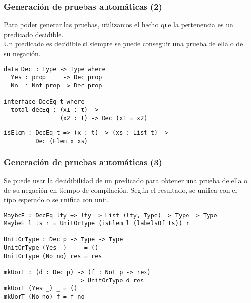 \documentclass{beamer}
\begin{document}
\begin{frame}[fragile]
\frametitle{Generación de pruebas automáticas (2)}

Para poder generar las pruebas, utilizamos el hecho que la pertenencia es un predicado decidible. \\

Un predicado es decidible si siempre se puede conseguir una prueba de ella o de su negación.

\pause

\begin{definition}
\begin{verbatim}
data Dec : Type -> Type where
  Yes : prop     -> Dec prop
  No  : Not prop -> Dec prop

interface DecEq t where
  total decEq : (x1 : t) -> 
                (x2 : t) -> Dec (x1 = x2)
\end{verbatim}
\end{definition}

\pause

\begin{definition}
\begin{verbatim}
isElem : DecEq t => (x : t) -> (xs : List t) -> 
         Dec (Elem x xs)
\end{verbatim}
\end{definition}

\end{frame}


\begin{frame}[fragile]
\frametitle{Generación de pruebas automáticas (3)}

Se puede usar la decidibilidad de un predicado para obtener una prueba de ella o de su negación en tiempo de compilación. Según el resultado, se unifica con el tipo esperado o se unifica con unit.

\pause

\begin{definition}
\begin{verbatim}
MaybeE : DecEq lty => lty -> List (lty, Type) -> Type -> Type
MaybeE l ts r = UnitOrType (isElem l (labelsOf ts)) r

UnitOrType : Dec p -> Type -> Type
UnitOrType (Yes _) _   = ()
UnitOrType (No no) res = res

mkUorT : (d : Dec p) -> (f : Not p -> res)
                     -> UnitOrType d res
mkUorT (Yes _) _ = ()
mkUorT (No no) f = f no
\end{verbatim}
\end{definition}

\end{frame}
\end{document}

